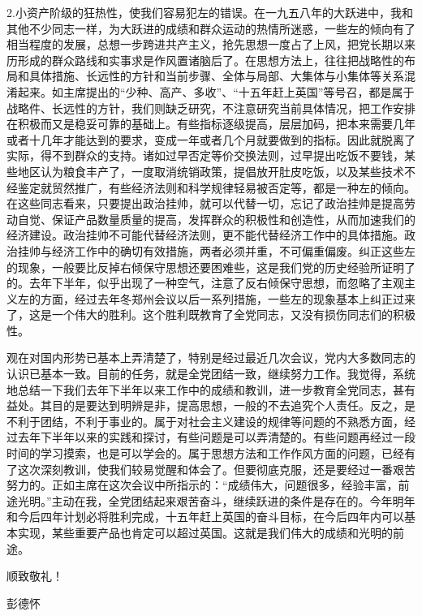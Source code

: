 \begin{maonote}
2.小资产阶级的狂热性，使我们容易犯左的错误。在一九五八年的大跃进中，我和其他不少同志一样，为大跃进的成绩和群众运动的热情所迷惑，一些左的倾向有了相当程度的发展，总想一步跨进共产主义，抢先思想一度占了上风，把党长期以来历形成的群众路线和实事求是作风置诸脑后了。在思想方法上，往往把战略性的布局和具体措施、长远性的方针和当前步骤、全体与局部、大集体与小集体等关系混淆起来。如主席提出的“少种、高产、多收”、“十五年赶上英国”等号召，都是属于战略件、长远性的方针，我们则缺乏研究，不注意研究当前具体情况，把工作安排在积极而又是稳妥可靠的基础上。有些指标逐级提高，层层加码，把本来需要几年或者十几年才能达到的要求，变成一年或者几个月就要做到的指标。因此就脱离了实际，得不到群众的支持。诸如过早否定等价交换法则，过早提出吃饭不要钱，某些地区认为粮食丰产了，一度取消统销政策，提倡放开肚皮吃饭，以及某些技术不经鉴定就贸然推广，有些经济法则和科学规律轻易被否定等，都是一种左的倾向。在这些同志看来，只要提出政治挂帅，就可以代替一切，忘记了政治挂帅是提高劳动自觉、保证产品数量质量的提高，发挥群众的积极性和创造性，从而加速我们的经济建设。政治挂帅不可能代替经济法则，更不能代替经济工作中的具体措施。政治挂帅与经济工作中的确切有效措施，两者必须并重，不可偏重偏废。纠正这些左的现象，一般要比反掉右倾保守思想还要困难些，这是我们党的历史经验所证明了的。去年下半年，似乎出现了一种空气，注意了反右倾保守思想，而忽略了主观主义左的方面，经过去年冬郑州会议以后一系列措施，一些左的现象基本上纠正过来了，这是一个伟大的胜利。这个胜利既教育了全党同志，又没有损伤同志们的积极性。

观在对国内形势已基本上弄清楚了，特别是经过最近几次会议，党内大多数同志的认识已基本一致。目前的任务，就是全党团结一致，继续努力工作。我觉得，系统地总结一下我们去年下半年以来工作中的成绩和教训，进一步教育全党同志，甚有益处。其目的是要达到明辨是非，提高思想，一般的不去追究个人责任。反之，是不利于团结，不利于事业的。属于对社会主义建设的规律等问题的不熟悉方面，经过去年下半年以来的实践和探讨，有些问题是可以弄清楚的。有些问题再经过一段时间的学习摸索，也是可以学会的。属于思想方法和工作作风方面的问题，已经有了这次深刻教训，使我们较易觉醒和体会了。但要彻底克服，还是要经过一番艰苦努力的。正如主席在这次会议中所指示的：“成绩伟大，问题很多，经验丰富，前途光明。”主动在我，全党团结起来艰苦奋斗，继续跃进的条件是存在的。今年明年和今后四年计划必将胜利完成，十五年赶上英国的奋斗目标，在今后四年内可以基本实现，某些重要产品也肯定可以超过英国。这就是我们伟大的成绩和光明的前途。

顺致敬礼！

彭德怀


\end{maonote}
